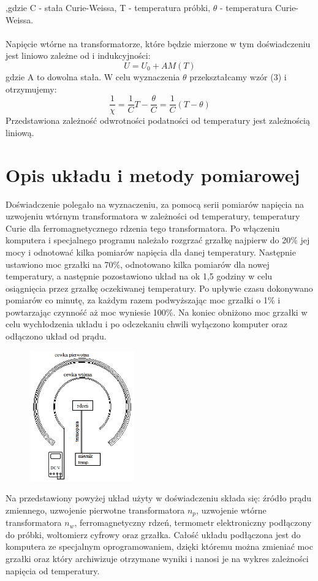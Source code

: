 \documentclass[a4paper,10pt]{article}
\begin{document}
,gdzie C - stała Curie-Weissa, T - temperatura próbki, $\theta$ - temperatura Curie-Weissa.
\\
\\Napięcie wtórne na transformatorze, które będzie mierzone w tym doświadczeniu jest liniowo zależne od i indukcyjności:
\begin{equation}
U = U_0 + AM(T)
\end{equation}
gdzie A to dowolna stała. W celu wyznaczenia $\theta$ przekształcamy wzór (3) i otrzymujemy:
\begin{equation}
\frac{1}{\chi} = \frac{1}{C} T - \frac{\theta}{C} = \frac{1}{C} (T-\theta)
\end{equation}
Przedstawiona zależność odwrotności podatności od temperatury jest zależnością liniową.

\section{Opis układu i metody pomiarowej}
Doświadczenie polegało na wyznaczeniu, za pomocą serii pomiarów napięcia na uzwojeniu wtórnym transformatora w zależności od temperatury, temperatury Curie dla
ferromagnetycznego rdzenia tego transformatora. Po włączeniu komputera i specjalnego programu należało rozgrzać grzałkę najpierw do 20\% jej mocy i odnotować
kilka pomiarów napięcia dla danej temperatury. Następnie ustawiono moc grzałki na 70\%, odnotowano kilka pomiarów dla nowej temperatury, a następnie pozostawiono
układ na ok 1,5 godziny w celu osiągnięcia przez grzałkę oczekiwanej temperatury. Po upływie czasu dokonywano pomiarów co minutę, za każdym razem podwyższając moc grzałki o 1\% i powtarzając czynność aż moc wyniesie 100\%. Na koniec obniżono moc grzałki w celu wychłodzenia układu i po odczekaniu chwili wyłączono komputer oraz odłączono układ od prądu.
\begin{figure}[H]
\center
\includegraphics[width=0.4\textwidth]{uklad.png}
\end{figure}
Na przedstawiony powyżej układ użyty w doświadczeniu składa się: źródło prądu zmiennego, uzwojenie pierwotne transformatora $n_p$, uzwojenie wtórne transformatora $n_w$, ferromagnetyczny rdzeń, termometr elektroniczny podłączony do próbki, woltomierz cyfrowy oraz grzałka. Całość układu podłączona jest do komputera ze specjalnym oprogramowaniem, dzięki któremu można zmieniać moc grzałki oraz który archiwizuje otrzymane wyniki i nanosi je na wykres zależności napięcia od temperatury.
\end{document}
